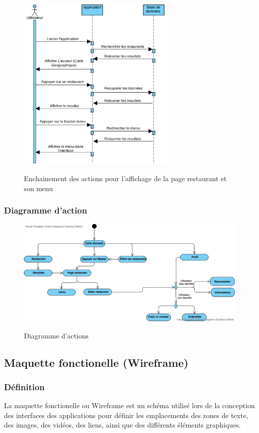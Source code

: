 \begin{figure}[!ht]

    \centering
    \includegraphics[width=3in]{images/Chapitre3/enchainement_affichage_resto_menu.jpg}
    \label{fig:label2}
    \caption{Enchainement des actions pour l'affichage de la page restaurant et son menu}
\end{figure}

\newpage
\subsubsection{Diagramme d'action}
\begin{figure}[!ht]

    \centering
    \includegraphics[width=6in]{images/Chapitre3/Diagramme_action.png}
    \label{fig:label3}
    \caption{Diagramme d'actions}
\end{figure}


\newpage
\subsection{Maquette fonctionelle (Wireframe)}
\subsubsection{Définition} La maquette fonctionelle ou Wireframe est
un schéma utilisé lors de la conception des interfaces des applications
pour définir les emplacements des  zones de texte, des images, des vidéos, des liens,
ainsi que des différents éléments graphiques.
